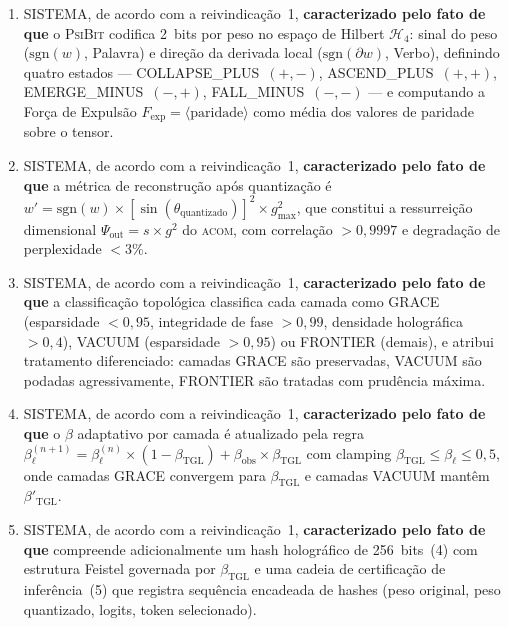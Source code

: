 \documentclass[12pt,a4paper]{article}
\newcommand{\betatgl}{\beta_{\text{TGL}}}
\newcommand{\betared}{\beta'_{\text{TGL}}}
\newcommand{\Hfour}{\mathcal{H}_4}
\newcommand{\Psifield}{\Psi}
\newcommand{\ACOM}{\textsc{acom}}
\newcommand{\PsiBit}{\textsc{PsiBit}}
\begin{document}
\begin{enumerate}[label=\textbf{\arabic*.}, leftmargin=*, itemsep=0.8em]
\begin{enumerate}[label=(\alph*)]
sendo que o sistema opera com zero parâmetros livres, derivando todos os limiares, fronteiras e taxas da única constante $\betatgl = \alpha \times \sqrt{e}$.
\end{enumerate}

\item SISTEMA, de acordo com a reivindicação~1, \textbf{caracterizado pelo fato de que} o \PsiBit{} codifica 2~bits por peso no espaço de Hilbert $\Hfour$: sinal do peso ($\text{sgn}(w)$, Palavra) e direção da derivada local ($\text{sgn}(\partial w)$, Verbo), definindo quatro estados --- COLLAPSE\_PLUS~$(+,-)$, ASCEND\_PLUS~$(+,+)$, EMERGE\_MINUS~$(-,+)$, FALL\_MINUS~$(-,-)$ --- e computando a Força de Expulsão $F_{\text{exp}} = \langle\text{paridade}\rangle$ como média dos valores de paridade sobre o tensor.

\item SISTEMA, de acordo com a reivindicação~1, \textbf{caracterizado pelo fato de que} a métrica de reconstrução após quantização é $w' = \text{sgn}(w) \times [\sin(\theta_{\text{quantizado}})]^2 \times g_{\max}^2$, que constitui a ressurreição dimensional $\Psifield_{\text{out}} = s \times g^2$ do \ACOM, com correlação $> 0{,}9997$ e degradação de perplexidade $< 3\%$.

\item SISTEMA, de acordo com a reivindicação~1, \textbf{caracterizado pelo fato de que} a classificação topológica classifica cada camada como GRACE (esparsidade $< 0{,}95$, integridade de fase $> 0{,}99$, densidade holográfica $> 0{,}4$), VACUUM (esparsidade $> 0{,}95$) ou FRONTIER (demais), e atribui tratamento diferenciado: camadas GRACE são preservadas, VACUUM são podadas agressivamente, FRONTIER são tratadas com prudência máxima.

\item SISTEMA, de acordo com a reivindicação~1, \textbf{caracterizado pelo fato de que} o $\beta$ adaptativo por camada é atualizado pela regra $\beta^{(n+1)}_\ell = \beta^{(n)}_\ell \times (1 - \betatgl) + \beta_{\text{obs}} \times \betatgl$ com clamping $\betatgl \leq \beta_\ell \leq 0{,}5$, onde camadas GRACE convergem para $\betatgl$ e camadas VACUUM mantêm $\betared$.

\item SISTEMA, de acordo com a reivindicação~1, \textbf{caracterizado pelo fato de que} compreende adicionalmente um hash holográfico de 256~bits~(4) com estrutura Feistel governada por $\betatgl$ e uma cadeia de certificação de inferência~(5) que registra sequência encadeada de hashes (peso original, peso quantizado, logits, token selecionado).


\end{enumerate}
\end{document}
